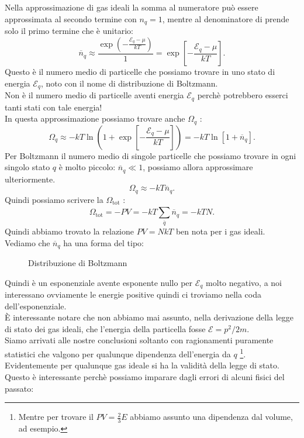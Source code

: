 Nella approssimazione di gas ideali la somma al numeratore può essere approssimata al secondo termine con $n_{q} = 1$, mentre al denominatore di prende solo il primo termine che è unitario:
\[
	\overline{n}_{q} \approx \frac{\exp\left( - \frac{\mathcal{E}_{q}-\mu}{kT} \right) }{1} = \exp\left[ -\frac{\mathcal{E}_{q}-\mu}{kT} \right] 
.\] 
Questo è il numero medio di particelle che possiamo trovare in uno stato di energia $\mathcal{E}_{q}$, noto con il nome di distribuzione di Boltzmann.\\
Non è il numero medio di particelle aventi energia $\mathcal{E}_{q}$ perchè potrebbero esserci tanti stati con tale energia!\\
In questa approssimazione possiamo trovare anche $\Omega_{q}$ :
\[
	\Omega_{q} \approx -kT \ln \left( 1+ \exp \left[ -\frac{\mathcal{E}_{q}-\mu}{kT} \right]  \right) = -kT \ln \left[ 1+ \overline{n}_{q} \right]	\label{eq:Landau-ordine_0}
.\] 
Per Boltzmann il numero medio di singole particelle che possiamo trovare in ogni singolo stato $q$ è molto piccolo: $\overline{n}_{q}\ll 1$, possiamo allora approssimare ulteriormente.
\[
	\Omega_{q} \approx -kT \overline{n}_{q} \label{eq:Landau_Boltzmann}
.\] 
Quindi possiamo scrivere la $\Omega_{\text{tot}}$ : 
\[
	\Omega_{\text{tot}} = - PV = -kT \sum_{\overline{q}}^{} \overline{n}_{q} = -kT N
.\] 
Quindi abbiamo trovato la relazione $PV = NkT$ ben nota per i gas ideali.\\
Vediamo che $\overline{n}_{q}$ ha una forma del tipo:
\begin{figure}[H]
    \centering
    \caption{Distribuzione di Boltzmann}
    \label{fig:distribuzione-di-boltzmann}
\end{figure}
\noindent
Quindi è un esponenziale avente esponente nullo per $\mathcal{E}_{q}$ molto negativo, a noi interessano ovviamente le energie positive quindi ci troviamo nella coda dell'esponenziale.\\
È interessante notare che non abbiamo mai assunto, nella derivazione della legge di stato dei gas ideali, che l'energia della particella fosse $\mathcal{E}= p^2 /2m$.\\
Siamo arrivati alle nostre conclusioni soltanto con ragionamenti puramente statistici che valgono per qualunque dipendenza dell'energia da $q$ \footnote{Mentre per trovare il $PV = \frac{2}{3}E$ abbiamo assunto una dipendenza dal volume, ad esempio.}.\\
Evidentemente per qualunque gas ideale si ha la validità della legge di stato. Questo è interessante perchè possiamo imparare dagli errori di alcuni fisici del passato:

